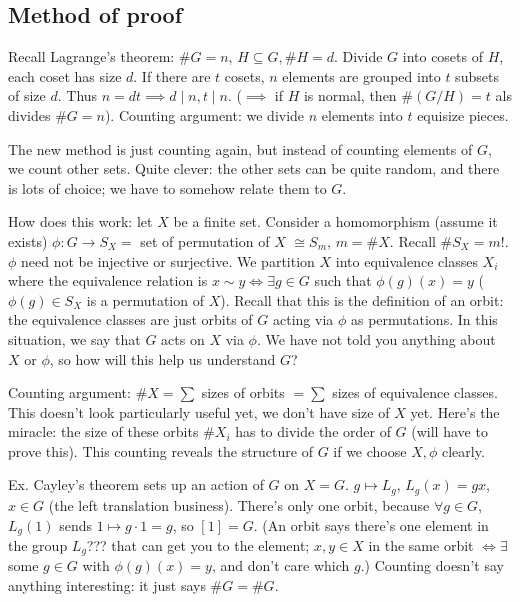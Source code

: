 \documentclass{article}
\theoremstyle{plain}
\theoremstyle{remark}
\begin{document}
\subsection{Method of proof}
Recall Lagrange's theorem: $\#G = n$, $H \subseteq G, \#H = d$.
Divide $G$ into cosets of $H$, each coset has size $d$.
If there are $t$ cosets, $n$ elements are grouped into $t$ subsets of size $d$.
Thus $n = dt \implies d\mid n, t \mid n$.
($\implies$ if $H$ is normal, then $\#(G/H) =t$ als divides $\#G = n$).
Counting argument: we divide $n$ elements into $t$ equisize pieces.

The new method is just counting again,
but instead of counting elements of $G$,
we count other sets.
Quite clever: the other sets can be quite random,
and there is lots of choice;
we have to somehow relate them to $G$.

How does this work: let $X$ be a finite set.
Consider a homomorphism (assume it exists)
$\phi \colon G \to S_X = $ set of permutation of $X$ $\cong S_m$, $m = \#X$.
Recall $\#S_X = m!$.
$\phi$ need not be injective or surjective.
We partition $X$ into equivalence classes $X_i$
where the equivalence relation is $x \sim y \iff \exists g \in G$
such that $\phi(g)(x) = y$
($\phi(g)\in S_X$ is a permutation of $X$).
Recall that this is the definition of an orbit:
the equivalence classes are just orbits of $G$ acting via $\phi$ as permutations.
In this situation, we say that $G$ acts on $X$ via $\phi$.
We have not told you anything about $X$ or $\phi$,
so how will this help us understand $G$?

Counting argument: $\#X = \sum$ sizes of orbits $ = \sum$ sizes of equivalence classes.
This doesn't look particularly useful yet,
we don't have size of $X$ yet.
Here's the miracle:
the size of these orbits $\#X_i$ has to divide the order of $G$
(will have to prove this).
This counting reveals the structure of $G$
if we choose $X,\phi$ clearly.

Ex. Cayley's theorem sets up an action of $G$ on $X = G$.
$g \mapsto L_g$, $L_g(x) = gx$, $x \in G$
(the left translation business).
There's only one orbit,
because $\forall g \in G$, $L_g(1)$ sends $1 \mapsto g\cdot 1 = g$,
so $[1] = G$.
(An orbit says there's one element in the group $L_g$???
that can get you to the element;
$x,y \in X$ in the same orbit $\iff \exists$ some $g \in G$
with $\phi(g)(x) = y$,
and don't care which $g$.)
Counting doesn't say anything interesting:
it just says $\#G = \#G$.
\end{document}
